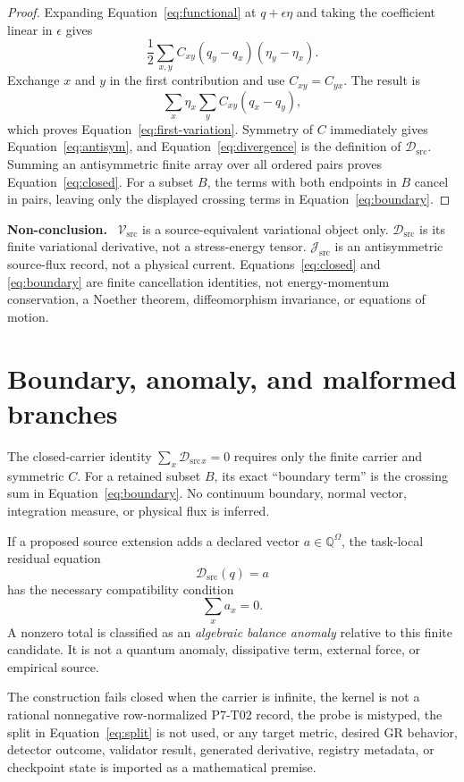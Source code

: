 \documentclass[11pt]{article}
\newenvironment{nonconclusion}{\par\smallskip\noindent\textbf{Non-conclusion.}\ }{\par\smallskip}
\newcommand{\Q}{\mathbb Q}
\newcommand{\Vsrc}{\mathcal V_{\mathrm{src}}}
\newcommand{\Dsrc}{\mathcal D_{\mathrm{src}}}
\newcommand{\Jsrc}{\mathcal J_{\mathrm{src}}}
\begin{document}
\begin{proof}
Expanding Equation~\eqref{eq:functional} at \(q+\epsilon\eta\) and taking
the coefficient linear in \(\epsilon\) gives
\[
 \frac12\sum_{x,y}C_{xy}(q_y-q_x)(\eta_y-\eta_x).
\]
Exchange \(x\) and \(y\) in the first contribution and use
\(C_{xy}=C_{yx}\).  The result is
\[
 \sum_x\eta_x\sum_yC_{xy}(q_x-q_y),
\]
which proves Equation~\eqref{eq:first-variation}.  Symmetry of \(C\)
immediately gives Equation~\eqref{eq:antisym}, and
Equation~\eqref{eq:divergence} is the definition of \(\Dsrc\).  Summing an
antisymmetric finite array over all ordered pairs proves
Equation~\eqref{eq:closed}.  For a subset \(B\), the terms with both
endpoints in \(B\) cancel in pairs, leaving only the displayed crossing
terms in Equation~\eqref{eq:boundary}.
\end{proof}

\begin{nonconclusion}
\(\Vsrc\) is a source-equivalent variational object only.
\(\Dsrc\) is its finite variational derivative, not a stress-energy tensor.
\(\Jsrc\) is an antisymmetric source-flux record, not a physical current.
Equations~\eqref{eq:closed} and \eqref{eq:boundary} are finite cancellation
identities, not energy-momentum conservation, a Noether theorem,
diffeomorphism invariance, or equations of motion.
\end{nonconclusion}

\section{Boundary, anomaly, and malformed branches}

The closed-carrier identity \(\sum_x\Dsrc{}_{x}=0\) requires only the finite
carrier and symmetric \(C\).  For a retained subset \(B\), its exact
``boundary term'' is the crossing sum in Equation~\eqref{eq:boundary}.
No continuum boundary, normal vector, integration measure, or physical
flux is inferred.

If a proposed source extension adds a declared vector \(a\in\Q^\Omega\),
the task-local residual equation
\[
 \Dsrc(q)=a
\]
has the necessary compatibility condition
\[
 \sum_xa_x=0.
\]
A nonzero total is classified as an \emph{algebraic balance anomaly}
relative to this finite candidate.  It is not a quantum anomaly, dissipative
term, external force, or empirical source.

The construction fails closed when the carrier is infinite, the kernel is
not a rational nonnegative row-normalized P7-T02 record, the probe is
mistyped, the split in Equation~\eqref{eq:split} is not used, or any target
metric, desired GR behavior, detector outcome, validator result, generated
derivative, registry metadata, or checkpoint state is imported as a
mathematical premise.
\end{document}
